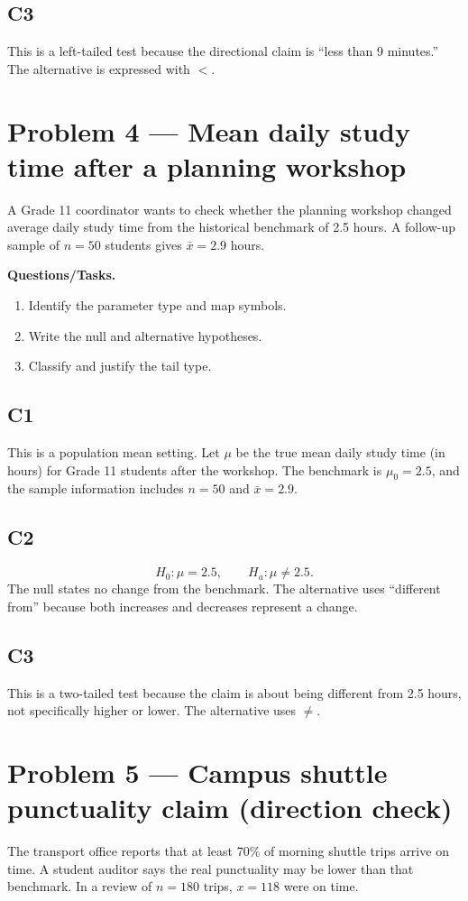 	\subsection*{C3}
	This is a left-tailed test because the directional claim is ``less than 9 minutes.'' The alternative is expressed with \(<\).


	\section{Problem 4 --- Mean daily study time after a planning workshop}
	A Grade 11 coordinator wants to check whether the planning workshop changed average daily study time from the historical benchmark of 2.5 hours. A follow-up sample of \(n=50\) students gives \(\bar{x}=2.9\) hours.
	
	\textbf{Questions/Tasks.}
	\begin{enumerate}
		\item[(C1)] Identify the parameter type and map symbols.
		\item[(C2)] Write the null and alternative hypotheses.
		\item[(C3)] Classify and justify the tail type.
	\end{enumerate}
	
	\subsection*{C1}
	This is a population mean setting. Let \(\mu\) be the true mean daily study time (in hours) for Grade 11 students after the workshop. The benchmark is \(\mu_0=2.5\), and the sample information includes \(n=50\) and \(\bar{x}=2.9\).
	
	\subsection*{C2}
	\[
	H_0\colon \mu=2.5, \qquad H_a\colon \mu\neq2.5.
	\]
	The null states no change from the benchmark. The alternative uses ``different from'' because both increases and decreases represent a change.
	
	\subsection*{C3}
	This is a two-tailed test because the claim is about being different from 2.5 hours, not specifically higher or lower. The alternative uses \(\neq\).


	\section{Problem 5 --- Campus shuttle punctuality claim (direction check)}
	The transport office reports that at least 70\% of morning shuttle trips arrive on time. A student auditor says the real punctuality may be lower than that benchmark. In a review of \(n=180\) trips, \(x=118\) were on time.
	
